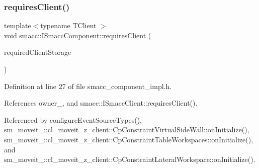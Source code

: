 \mbox{\label{classsmacc_1_1ISmaccComponent_a36c085d906fbae0fcaee817aaeafebf4}} 
\subsubsection{\texorpdfstring{requires\+Client()}{requiresClient()}}
{\footnotesize\ttfamily template$<$typename T\+Client $>$ \\
void smacc\+::\+I\+Smacc\+Component\+::requires\+Client (\begin{DoxyParamCaption}\item[{\hyperlink{classTClient}{T\+Client} $\ast$\&}]{required\+Client\+Storage }\end{DoxyParamCaption})\hspace{0.3cm}{\ttfamily [protected]}}



Definition at line 27 of file smacc\+\_\+component\+\_\+impl.\+h.



References owner\+\_\+, and smacc\+::\+I\+Smacc\+Client\+::requires\+Client().



Referenced by configure\+Event\+Source\+Types(), sm\+\_\+moveit\+\_\+::cl\+\_\+moveit\+\_\+z\+\_\+client\+::\+Cp\+Constraint\+Virtual\+Side\+Wall\+::on\+Initialize(), sm\+\_\+moveit\+\_\+::cl\+\_\+moveit\+\_\+z\+\_\+client\+::\+Cp\+Constraint\+Table\+Workspaces\+::on\+Initialize(), and sm\+\_\+moveit\+\_\+::cl\+\_\+moveit\+\_\+z\+\_\+client\+::\+Cp\+Constraint\+Lateral\+Workspace\+::on\+Initialize().


